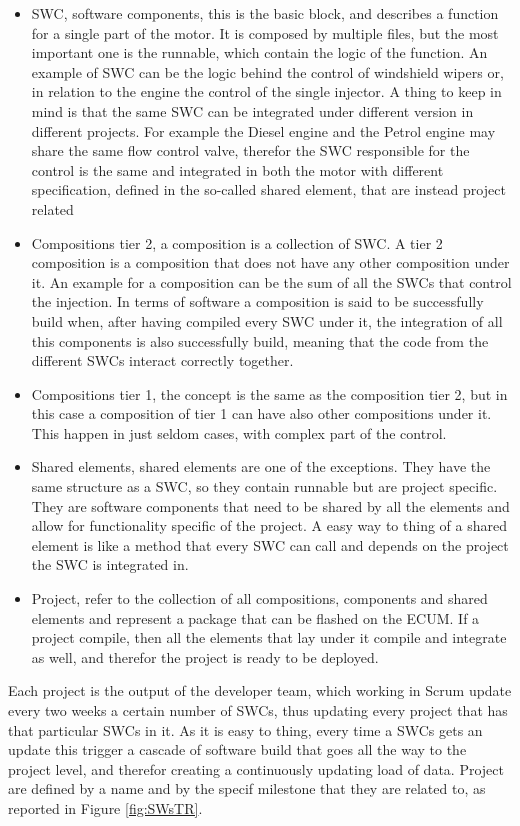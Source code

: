 \documentclass[../main.tex]{subfiles}
\begin{document}
\begin{itemize}
    \item SWC, software components, this is the basic block, and describes a function for a single part of the motor. It is composed by multiple files, but the most important one is the runnable, which contain the logic of the function. An example of SWC can be the logic behind the control of windshield wipers or, in relation to the engine the control of the single injector. A thing to keep in mind is that the same SWC can be integrated under different version in different projects. For example the Diesel engine and the Petrol engine may share the same flow control valve, therefor the SWC responsible for the control is the same and integrated in both the motor with different specification, defined in the so-called shared element, that are instead project related
    \item Compositions tier 2, a composition is a collection of SWC. A tier 2 composition is a composition that does not have any other composition under it. An example for a composition can be the sum of all the SWCs that control the injection. In terms of software a composition is said to be successfully build when, after having compiled every SWC under it, the integration of all this components is also successfully build, meaning that the code from the different SWCs interact correctly together.
    \item Compositions tier 1, the concept is the same as the composition tier 2, but in this case a composition of tier 1 can have also other compositions under it. This happen in just seldom cases, with complex part of the control.
    \item Shared elements, shared elements are one of the exceptions. They have the same structure as a SWC, so they contain runnable but are project specific. They are software components that need to be shared by all the elements and allow for functionality specific of the project. A easy way to thing of a shared element is like a method that every SWC can call and depends on the project the SWC is integrated in.
    \item Project, refer to the collection of all compositions, components and shared elements and represent a package that can be flashed on the \gls{ECUM}. If a project compile, then all the elements that lay under it compile and integrate as well, and therefor the project is ready to be deployed. 
\end{itemize}
Each project is the output of the developer team, which working in Scrum update every two weeks a certain number of SWCs, thus updating every project that has that particular SWCs in it. As it is easy to thing, every time a SWCs gets an update this trigger a cascade of software build that goes all the way to the project level, and therefor creating a continuously updating load of data. Project are defined by a name and by the specif milestone that they are related to, as reported in Figure \ref{fig:SWsTR}.
\end{document}
